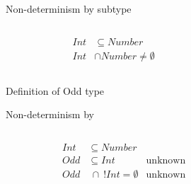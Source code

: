 \begin{frame}{Non-determinism by subtype}
  \begin{columns}[T]
    \begin{column}{0.4\textwidth}
      \centering
      
      \begin{align*}
        Int&\subseteq Number\\
        Int &\cap Number \neq \emptyset
      \end{align*}%
      \scalebox{0.8}{}%
    \end{column}%
    \begin{column}{0.6\textwidth}
      \only<1>{\scalebox{0.9}{}}%
      \only<3>{\scalebox{0.8}{}}%
    \end{column}
  \end{columns}
\end{frame}



\newsavebox\oddbox
\begin{lrbox}{\oddbox}
  \begin{minipage}{11cm}
    
  \end{minipage}
\end{lrbox}

\begin{frame}{Definition of Odd type}
  \usebox\oddbox
\end{frame}



\begin{frame}{Non-determinism by }
  \begin{columns}[T]
    \begin{column}{0.35\textwidth}
      \centering
      
      \begin{align*}
        Int&\subseteq Number\\
        Odd&\subseteq Int &\text{unknown}\\
        Odd&~\cap~ !Int = \emptyset &\text{unknown}
      \end{align*}
      \scalebox{0.9}{}%
    \end{column}%
    \begin{column}{0.7\textwidth}
    \end{column}
  \end{columns}
\end{frame}




